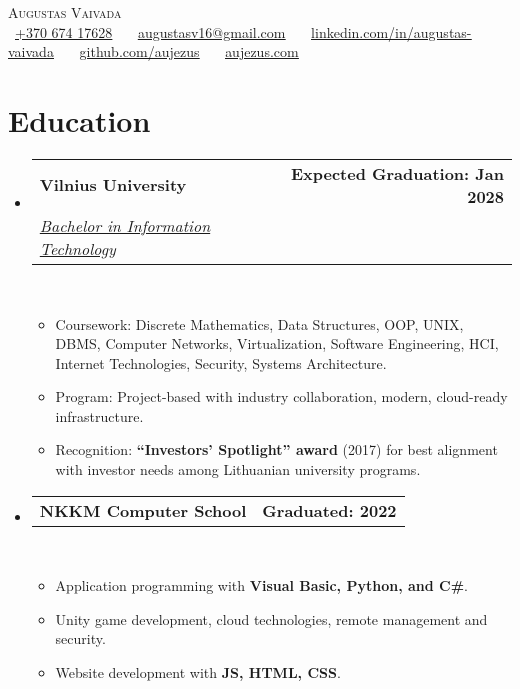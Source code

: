 \documentclass[letterpaper,11pt]{article}
\makeatletter
\newcommand{\resumeItem}[1]{
  \item\small{
    {#1 \vspace{0pt}}
  }
}
\newcommand{\resumeSubheading}[4]{
  \vspace{-2pt}\item
    \begin{tabular*}{1.0\textwidth}[t]{l@{\extracolsep{\fill}}r}
      \textbf{#1} & \textbf{\small #2} \\
      \textit{\small#3} & \textit{\small #4} \\
    \end{tabular*}\vspace{-7pt}
}
\newcommand{\resumeProjectHeading}[2]{
    \item
    \begin{tabular*}{1.001\textwidth}{l@{\extracolsep{\fill}}r}
      \small#1 & \textbf{\small #2}\\
    \end{tabular*}\vspace{-7pt}
}
\newcommand{\resumeSubHeadingListStart}{\begin{itemize}[leftmargin=0.0in, label={}]}
\newcommand{\resumeSubHeadingListEnd}{\end{itemize}}\vspace{0pt}
\newcommand{\resumeItemListStart}{\begin{itemize}}
\newcommand{\resumeItemListEnd}{\end{itemize}\vspace{-5pt}}
\makeatother
\begin{document}
\begin{center}
  {\Large \scshape Augustas Vaivada}\\[2mm]
  {\footnotesize
    \raisebox{-0.1\height}{\faPhone}\ \underline{\href{tel:+37067417628}{+370 674 17628}}\ ~
    \raisebox{-0.1\height}{\faEnvelope}\ \underline{\href{mailto:augustasv16@gmail.com}{augustasv16@gmail.com}}\ ~
    \raisebox{-0.1\height}{\faLinkedin}\ \underline{\href{https://www.linkedin.com/in/augustas-vaivada}{linkedin.com/in/augustas-vaivada}}\ ~
    \raisebox{-0.1\height}{\faGithub}\ \underline{\href{https://github.com/aujezus}{github.com/aujezus}}\ ~
    \raisebox{-0.1\height}{\faGlobe}\ \underline{\href{https://aujezus.com}{aujezus.com}}
  }
  \vspace{-8pt}
\end{center}

\section*{Education}
\vspace{1mm}

\resumeSubHeadingListStart
  \resumeSubheading
    {Vilnius University}{Expected Graduation: Jan 2028}
    {\href{https://www.vu.lt/studijos/stojantiesiems/bakalauro-studiju-sarasas/informacines-technologijos}{Bachelor in Information Technology}}{}
            \\[5mm]
    

\resumeItemListStart
  \resumeItem{Coursework: Discrete Mathematics, Data Structures, OOP, UNIX, DBMS, Computer Networks, Virtualization, Software Engineering, HCI, Internet Technologies, Security, Systems Architecture.}
  \resumeItem{Program: Project-based with industry collaboration, modern, cloud-ready infrastructure.}
  \resumeItem{Recognition: \textbf{“Investors’ Spotlight” award} (2017) for best alignment with investor needs among Lithuanian university programs.}
\resumeItemListEnd

 \vspace{-15pt}

 \resumeProjectHeading
            {\textbf{NKKM Computer School}} {Graduated: 2022}
            \\[5mm]
          \resumeItemListStart
            \resumeItem{Application programming with \textbf{Visual Basic, Python, and C\#}.}
            \resumeItem{Unity game development, cloud technologies, remote management and security.}
            \resumeItem{Website development with \textbf{JS, HTML, CSS}.}
          \resumeItemListEnd
\resumeSubHeadingListEnd
\end{document}
